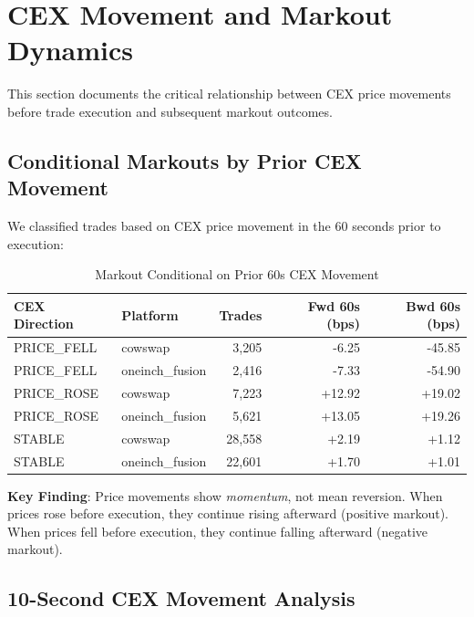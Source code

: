 \documentclass[11pt,a4paper]{article}
\begin{document}
\section{CEX Movement and Markout Dynamics}

This section documents the critical relationship between CEX price movements before trade execution and subsequent markout outcomes.

\subsection{Conditional Markouts by Prior CEX Movement}

We classified trades based on CEX price movement in the 60 seconds prior to execution:

\begin{table}[H]
\centering
\caption{Markout Conditional on Prior 60s CEX Movement}
\begin{tabular}{llrrr}
\toprule
\textbf{CEX Direction} & \textbf{Platform} & \textbf{Trades} & \textbf{Fwd 60s (bps)} & \textbf{Bwd 60s (bps)} \\
\midrule
PRICE\_FELL & cowswap & 3,205 & -6.25 & -45.85 \\
PRICE\_FELL & oneinch\_fusion & 2,416 & -7.33 & -54.90 \\
PRICE\_ROSE & cowswap & 7,223 & +12.92 & +19.02 \\
PRICE\_ROSE & oneinch\_fusion & 5,621 & +13.05 & +19.26 \\
STABLE & cowswap & 28,558 & +2.19 & +1.12 \\
STABLE & oneinch\_fusion & 22,601 & +1.70 & +1.01 \\
\bottomrule
\end{tabular}
\end{table}

\textbf{Key Finding}: Price movements show \textit{momentum}, not mean reversion. When prices rose before execution, they continue rising afterward (positive markout). When prices fell before execution, they continue falling afterward (negative markout).

\subsection{10-Second CEX Movement Analysis}
\end{document}
